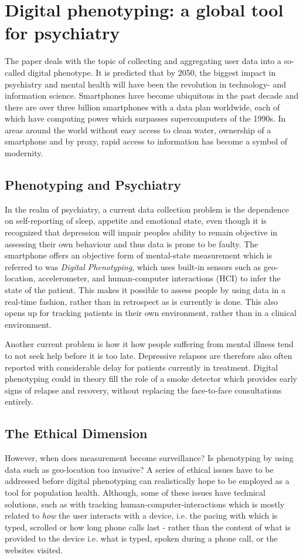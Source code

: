 \section{Digital phenotyping: a global tool for psychiatry}
The paper \cite{digital_phenotyping} deals with the topic of collecting and aggregating user data into a so-called digital phenotype. It is predicted that by 2050, the biggest impact in psychiatry and mental health will have been the revolution in technology- and information science. Smartphones have become ubiquitous in the past decade and there are over three billion smartphones with a data plan worldwide, each of which have computing power which surpasses supercomputers of the 1990s. In areas around the world without easy access to clean water, ownership of a smartphone and by proxy, rapid access to information has become a symbol of modernity. 

\subsection{Phenotyping and Psychiatry}
In the realm of psychiatry, a current data collection problem is the dependence on self-reporting of sleep, appetite and emotional state, even though it is recognized that depression will impair peoples ability to remain objective in assessing their own behaviour and thus data is prone to be faulty. The smartphone offers an objective form of mental-state measurement which is referred to was \textit{Digital Phenotyping}, which uses built-in sensors such as geo-location, accelerometer, and human-computer interactions (HCI) to infer the state of the patient. This makes it possible to assess people by using data in a real-time fashion, rather than in retrospect as is currently is done. This also opens up for tracking patients in their own environment, rather than in a clinical environment. 

Another current problem is how it how people suffering from mental illness tend to not seek help before it is too late. Depressive relapses are therefore also often reported with considerable delay for patients currently in treatment. Digital phenotyping could in theory fill the role of a smoke detector which provides early signs of relapse and recovery, without replacing the face-to-face consultations entirely.

\subsection{The Ethical Dimension}
However, when does measurement become surveillance? Is phenotyping by using data such as geo-location too invasive? A series of ethical issues have to be addressed before digital phenotyping can realistically hope to be employed as a tool for population health. Although, some of these issues have technical solutions, such as with tracking human-computer-interactions which is mostly related to \textit{how} the user interacts with a device, i.e. the pacing with which is typed, scrolled or how long phone calls last - rather than the content of what is provided to the device i.e. what is typed, spoken during a phone call, or the websites visited. 
